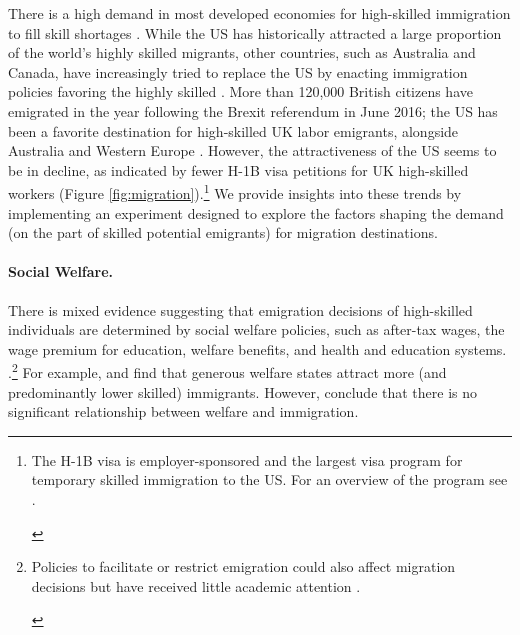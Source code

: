 \documentclass[12pt]{article}
\newcommand{\note}[1]{\footnote{\begin{doublespace}#1\end{doublespace}}}
\begin{document}
There is a high demand in most developed economies for high-skilled immigration to fill skill shortages \citep{Chaloff2009}. While the US has historically attracted a large proportion of the world's highly skilled migrants, other countries, such as Australia and Canada, have increasingly tried to replace the US by enacting immigration policies favoring the highly skilled \citep{Betts2011,Czaika2017,Karaca2018}. More than 120,000 British citizens have emigrated in the year following the Brexit referendum in June 2016; the US has been a favorite destination for high-skilled UK labor emigrants, alongside Australia and Western Europe \citep{ONS2017}.
However, the attractiveness of the US seems to be in decline, as indicated by fewer H-1B visa petitions for UK high-skilled workers (Figure \ref{fig:migration}).\note{The H-1B visa is employer-sponsored and the largest visa program for temporary skilled immigration to the US. For an overview of the program see \cite{Kerr2010}.}  We provide insights into these trends by implementing an experiment designed to explore the factors shaping the demand (on the part of skilled potential emigrants) for migration destinations. %


\paragraph{Social Welfare.} There is mixed evidence suggesting that emigration decisions of high-skilled individuals are determined by social welfare policies, such as after-tax wages, the wage premium for education, welfare benefits, and health and education systems. \citep{Boeri2012,Czaika2017,Geis2013}.\note{Policies to facilitate or restrict emigration could also affect migration decisions but have received little academic attention \citep{McKenzie2013}.}  For example, \citet{DeGiorgi2009,Boeri2010} and \cite{Borjas1999} find that generous welfare states attract more (and predominantly lower skilled) immigrants.  However, \citet{Giulietti2013} conclude that there is no significant relationship between welfare and immigration. 
\end{document}
